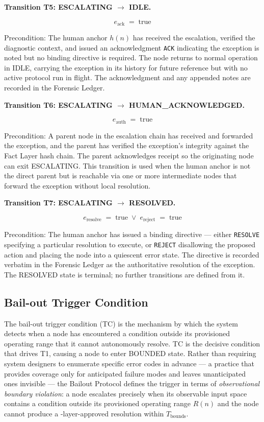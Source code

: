 \medskip
\noindent\textbf{Transition T5: ESCALATING $\rightarrow$ IDLE.}

\[
e_{\text{ack}} \;=\; \text{true}
\tag{T5}
\]

Precondition: The human anchor $h(n)$ has received the escalation, verified the diagnostic context, and issued an acknowledgment \texttt{ACK} indicating the exception is noted but no binding directive is required. The node returns to normal operation in IDLE, carrying the exception in its history for future reference but with no active protocol run in flight. The acknowledgment and any appended notes are recorded in the Forensic Ledger.

\medskip
\noindent\textbf{Transition T6: ESCALATING $\rightarrow$ HUMAN\_ACKNOWLEDGED.}

\[
e_{\text{auth}} \;=\; \text{true}
\tag{T6}
\]

Precondition: A parent node in the escalation chain has received and forwarded the exception, and the parent has verified the exception's integrity against the Fact Layer hash chain. The parent acknowledges receipt so the originating node can exit ESCALATING. This transition is used when the human anchor is not the direct parent but is reachable via one or more intermediate nodes that forward the exception without local resolution.

\medskip
\noindent\textbf{Transition T7: ESCALATING $\rightarrow$ RESOLVED.}

\[
e_{\text{resolve}} \;=\; \text{true} \;\lor\; e_{\text{reject}} \;=\; \text{true}
\tag{T7}
\]

Precondition: The human anchor has issued a binding directive — either \texttt{RESOLVE} specifying a particular resolution to execute, or \texttt{REJECT} disallowing the proposed action and placing the node into a quiescent error state. The directive is recorded verbatim in the Forensic Ledger as the authoritative resolution of the exception. The RESOLVED state is terminal; no further transitions are defined from it.

\subsection{Bail-out Trigger Condition}\label{sec:bailout-trigger}

The bail-out trigger condition (TC) is the mechanism by which the \bxthree{} system detects when a node has encountered a condition outside its provisioned operating range that it cannot autonomously resolve. TC is the decisive condition that drives T1, causing a node to enter BOUNDED state. Rather than requiring system designers to enumerate specific error codes in advance — a practice that provides coverage only for anticipated failure modes and leaves unanticipated ones invisible — the Bailout Protocol defines the trigger in terms of \emph{observational boundary violation}: a node escalates precisely when its observable input space contains a condition outside its provisioned operating range $R(n)$ and the node cannot produce a \fact-layer-approved resolution within $T_{\text{bounds}}$.

